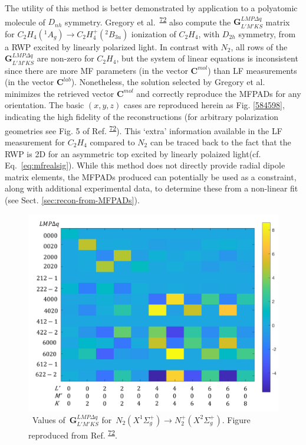 \documentclass[10pt]{article}
\begin{document}
The utility of this method is better demonstrated by application to a polyatomic molecule of $D_{nh}$ symmetry. Gregory et al.~\textsuperscript{\hyperref[csl:72]{72}} also compute the $\mathbf{{G}}^{LMP\Delta q }_{L'M'KS}$ matrix for $C_2H_4(^1A_g) \rightarrow C_2H_4^+(^2B_{3u})$ ionization of $C_2H_4$, with $D_{2h}$ symmetry, from a RWP excited by linearly polarized light. In contrast with $N_2$, all rows of the $\mathbf{{G}}^{LMP\Delta q }_{L'M'KS}$ are non-zero for $C_2H_4$, but the system of linear equations is inconsistent since there are more MF parameters (in the vector $\mathbf{C}^{mol}$) than LF measurements (in the vector $\mathbf{C}^{lab}$). Nonetheless, the solution selected by Gregory et al. minimizes the retrieved vector $\mathbf{C}^{mol}$ and correctly reproduce the MFPADs for any orientation. The basic $(x,y,z)$ cases are reproduced herein as Fig. \ref{584598}, indicating the high fidelity of the reconstructions (for arbitrary polarization geometries see Fig. 5 of Ref. \textsuperscript{\hyperref[csl:72]{72}}). This `extra' information available in the LF measurement for $C_2H_4$ compared to $N_2$ can be traced back to the fact that the RWP is 2D for an asymmetric top excited by linearly polaized light(cf. Eq.~\ref{eq:mfrealsig}). While this method does not directly provide radial dipole matrix elements, the MFPADs produced can potentially be used as a constraint, along with additional experimental data, to determine these from a non-linear fit (see Sect. \ref{sec:recon-from-MFPADs}).
\begin{figure}[H]
\begin{center}
\includegraphics[width=0.70\columnwidth]{figures/GFinalplot/GFinalplot}
\caption{{~\(\)Values of~\(\mathbf{G}^{LMP\Delta q }_{L'M'KS}\) for~\(N_2(X^{1}\Sigma^{+}_{g}) \rightarrow N^+_2(X^{2}\Sigma^{+}_{g})\).
Figure reproduced from Ref.
\protect\textsuperscript{\hyperref[csl:72]{72}}.
{\label{931809}}{\label{931809}}%
}}
\end{center}
\end{figure}
\end{document}

